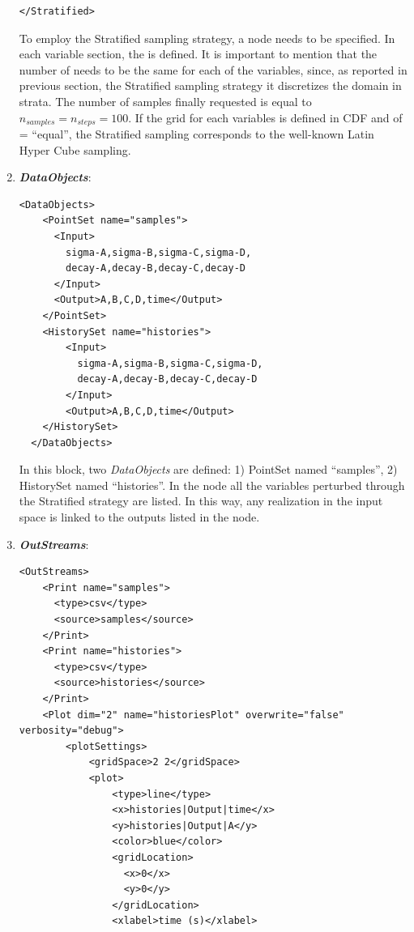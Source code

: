 \begin{enumerate}
\begin{lstlisting}[style=XML,morekeywords={arg,extension,pauseAtEnd,overwrite}]
    </Stratified> 
\end{lstlisting}
  To employ the Stratified sampling strategy, a 
   node needs to be specified. In each variable section, the   is defined. 
  It is important to mention that the number of  needs to be the same for each of the variables,
  since, as reported in previous section, the Stratified sampling strategy it discretizes the domain in strata. 
  The number of samples finally requested is equal to $n_{samples} = n_{steps} = 100$.
  If the grid for each variables is defined in CDF and of   = ``equal'', the Stratified
  sampling corresponds to the well-known Latin Hyper Cube sampling.
   \item \textbf{\textit{DataObjects}}:
\begin{lstlisting}[style=XML,morekeywords={arg,extension,pauseAtEnd,overwrite}]
  <DataObjects>
    <PointSet name="samples">
      <Input>
        sigma-A,sigma-B,sigma-C,sigma-D,
        decay-A,decay-B,decay-C,decay-D
      </Input>
      <Output>A,B,C,D,time</Output>
    </PointSet>
    <HistorySet name="histories">
        <Input>
          sigma-A,sigma-B,sigma-C,sigma-D,
          decay-A,decay-B,decay-C,decay-D
        </Input>
        <Output>A,B,C,D,time</Output>
    </HistorySet>
  </DataObjects>
\end{lstlisting}
  In this block, two \textit{DataObjects} are defined: 1) PointSet named 
  ``samples'', 2) HistorySet named ``histories''.
  In the  node all the variables 
  perturbed through the Stratified strategy are listed. In this way, any
  realization in the input space is linked to the outputs listed in  the 
   node.
   \item \textbf{\textit{OutStreams}}:   
\begin{lstlisting}[style=XML,morekeywords={arg,extension,pauseAtEnd,overwrite}]
  <OutStreams>
    <Print name="samples">
      <type>csv</type>
      <source>samples</source>
    </Print>
    <Print name="histories">
      <type>csv</type>
      <source>histories</source>
    </Print>
    <Plot dim="2" name="historiesPlot" overwrite="false" verbosity="debug">
        <plotSettings>
            <gridSpace>2 2</gridSpace>
            <plot>
                <type>line</type>
                <x>histories|Output|time</x>
                <y>histories|Output|A</y>
                <color>blue</color>
                <gridLocation>
                  <x>0</x>
                  <y>0</y>
                </gridLocation>
                <xlabel>time (s)</xlabel>

\end{lstlisting}
\end{enumerate}
